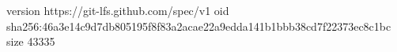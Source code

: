 version https://git-lfs.github.com/spec/v1
oid sha256:46a3e14c9d7db805195f8f83a2acae22a9edda141b1bbb38cd7f22373ec8c1bc
size 43335
